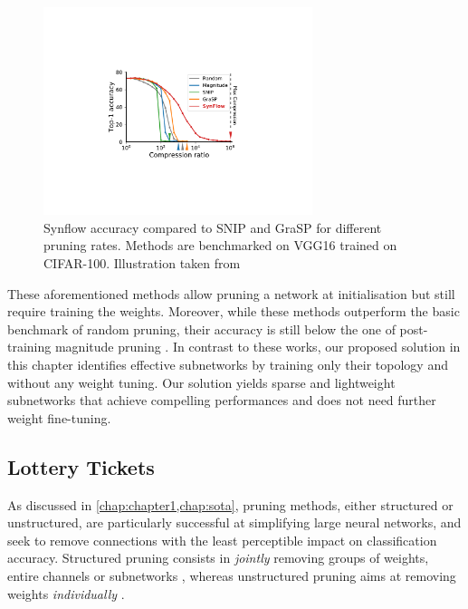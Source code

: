 \begin{figure}[htbp]
  \centering
  \includegraphics[width=0.7\textwidth]{chapter_2/assets/synflow_perfs.pdf}
  \caption{Synflow accuracy compared to SNIP and GraSP for different pruning
  rates. Methods are benchmarked on VGG16 trained on CIFAR-100. Illustration
  taken from \cite{DBLP:conf/nips/TanakaKYG20}} 
  \label{fig:chap2:synflow_perfs}
\end{figure}

These aforementioned methods allow pruning a network at initialisation but
still require training the weights. Moreover, while these methods outperform the
basic benchmark of random pruning, their accuracy is still below the one of
post-training magnitude pruning \cite{frankle2020pruning}. In contrast to these
works, our proposed solution in this chapter identifies effective subnetworks by
training only their topology and without any weight tuning. Our solution yields
sparse and lightweight subnetworks that achieve compelling performances and does
not need further weight fine-tuning.\\

\subsection{Lottery Tickets} 
As discussed in \cref{chap:chapter1,chap:sota}, pruning methods, either
structured or unstructured, are particularly successful at simplifying large
neural networks, and seek to remove connections with the least perceptible
impact on classification accuracy. Structured pruning consists in {\it jointly}
removing groups of weights, entire channels or subnetworks
\cite{DBLP:conf/iclr/0022KDSG17, DBLP:conf/iccv/LiuLSHYZ17}, whereas
unstructured pruning aims at removing weights {\it individually}
\cite{DBLP:conf/nips/HanPTD15,DBLP:journals/corr/HanMD15}.\\

